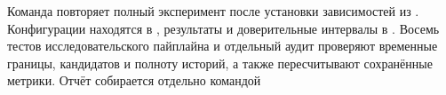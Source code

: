 Команда \mbox{} повторяет полный эксперимент
после установки зависимостей из \mbox{}.
Конфигурации находятся в , результаты и доверительные
интервалы в \mbox{}. Восемь тестов исследовательского пайплайна
и отдельный аудит проверяют временные границы, кандидатов и полноту историй,
а также пересчитывают сохранённые метрики.
Отчёт собирается отдельно командой \mbox{}
